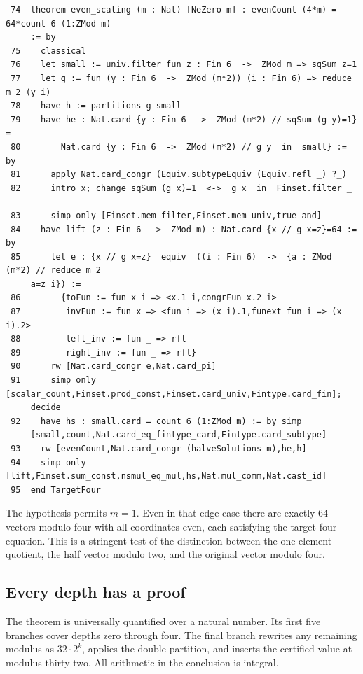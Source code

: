 \documentclass[12pt,letterpaper]{article}
\begin{document}
{\fontsize{9.2}{11.2}\selectfont\begin{verbatim}
 74  theorem even_scaling (m : Nat) [NeZero m] : evenCount (4*m) = 64*count 6 (1:ZMod m)
     := by
 75    classical
 76    let small := univ.filter fun z : Fin 6  ->  ZMod m => sqSum z=1
 77    let g := fun (y : Fin 6  ->  ZMod (m*2)) (i : Fin 6) => reduce m 2 (y i)
 78    have h := partitions g small
 79    have he : Nat.card {y : Fin 6  ->  ZMod (m*2) // sqSum (g y)=1} =
 80        Nat.card {y : Fin 6  ->  ZMod (m*2) // g y  in  small} := by
 81      apply Nat.card_congr (Equiv.subtypeEquiv (Equiv.refl _) ?_)
 82      intro x; change sqSum (g x)=1  <->  g x  in  Finset.filter _ _
 83      simp only [Finset.mem_filter,Finset.mem_univ,true_and]
 84    have lift (z : Fin 6  ->  ZMod m) : Nat.card {x // g x=z}=64 := by
 85      let e : {x // g x=z}  equiv  ((i : Fin 6)  ->  {a : ZMod (m*2) // reduce m 2
     a=z i}) :=
 86        {toFun := fun x i => <x.1 i,congrFun x.2 i>
 87         invFun := fun x => <fun i => (x i).1,funext fun i => (x i).2>
 88         left_inv := fun _ => rfl
 89         right_inv := fun _ => rfl}
 90      rw [Nat.card_congr e,Nat.card_pi]
 91      simp only [scalar_count,Finset.prod_const,Finset.card_univ,Fintype.card_fin];
     decide
 92    have hs : small.card = count 6 (1:ZMod m) := by simp
     [small,count,Nat.card_eq_fintype_card,Fintype.card_subtype]
 93    rw [evenCount,Nat.card_congr (halveSolutions m),he,h]
 94    simp only [lift,Finset.sum_const,nsmul_eq_mul,hs,Nat.mul_comm,Nat.cast_id]
 95  end TargetFour
\end{verbatim}}
The hypothesis permits $m=1$. Even in that edge case there are exactly $64$ vectors modulo four with all coordinates even, each satisfying the target-four equation. This is a stringent test of the distinction between the one-element quotient, the half vector modulo two, and the original vector modulo four.
\clearpage{}\subsection*{Every depth has a proof}\label{extract-FourCounts5}
The theorem is universally quantified over a natural number. Its first five branches cover depths zero through four. The final branch rewrites any remaining modulus as $32\cdot2^k$, applies the double partition, and inserts the certified value at modulus thirty-two. All arithmetic in the conclusion is integral.
\par
\end{document}
